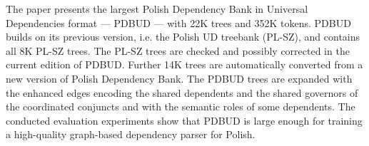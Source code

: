 The paper presents the largest Polish Dependency Bank in Universal Dependencies format --- PDBUD --- with 22K trees and 352K tokens. PDBUD builds on its previous version, i.e. the Polish UD treebank (PL-SZ), and contains all 8K PL-SZ trees. The PL-SZ trees are checked and possibly corrected in the current edition of PDBUD. Further 14K trees are automatically converted from a new version of Polish Dependency Bank. The PDBUD trees are expanded with the enhanced edges encoding the shared dependents and the shared governors of the coordinated conjuncts and with the semantic roles of some dependents. The conducted evaluation experiments show that PDBUD is large enough for training a high-quality graph-based dependency parser for Polish.

